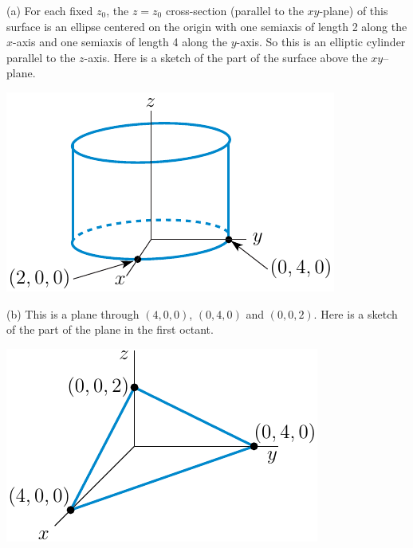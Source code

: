 \begin{solution} 
(a) 
For each fixed $z_0$, the $z=z_0$ cross-section (parallel to the $xy$-plane) 
of this surface is an ellipse centered on the origin with
one semiaxis of length 2 along the $x$-axis and one semiaxis of length 
4 along the $y$-axis. So this is an elliptic cylinder parallel to the $z$-axis.
Here is a sketch of the part of the surface above the $xy$--plane.
\begin{center}
     \includegraphics{fig/elliptical_cylinder.pdf}
\end{center}

(b)
This is a plane through $(4,0,0)$, $(0,4,0)$ and $(0,0,2)$.
Here is a sketch of the part of the plane in the first octant.
\begin{center}
     \includegraphics{fig/plane.pdf}
\end{center}


\end{solution}
